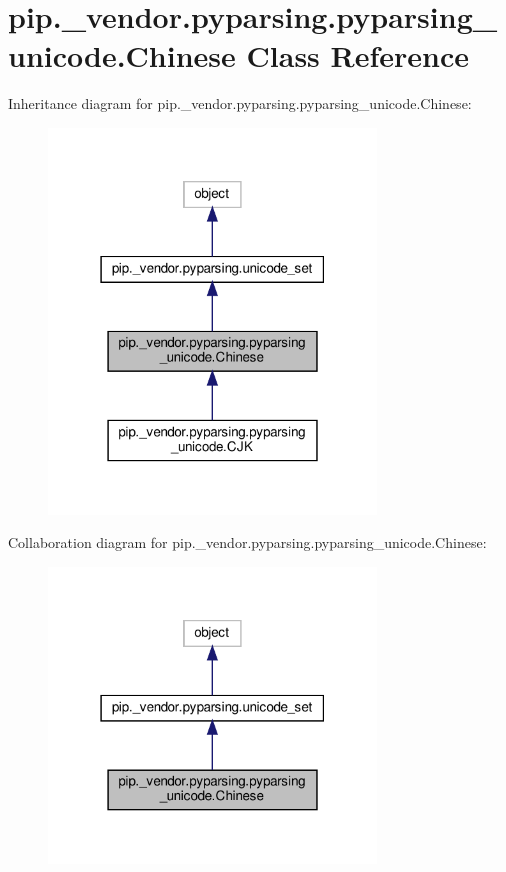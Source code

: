 \hypertarget{classpip_1_1__vendor_1_1pyparsing_1_1pyparsing__unicode_1_1Chinese}{}\section{pip.\+\_\+vendor.\+pyparsing.\+pyparsing\+\_\+unicode.\+Chinese Class Reference}
\label{classpip_1_1__vendor_1_1pyparsing_1_1pyparsing__unicode_1_1Chinese}


Inheritance diagram for pip.\+\_\+vendor.\+pyparsing.\+pyparsing\+\_\+unicode.\+Chinese\+:
\nopagebreak
\begin{figure}[H]
\begin{center}
\leavevmode
\includegraphics[width=247pt]{classpip_1_1__vendor_1_1pyparsing_1_1pyparsing__unicode_1_1Chinese__inherit__graph}
\end{center}
\end{figure}


Collaboration diagram for pip.\+\_\+vendor.\+pyparsing.\+pyparsing\+\_\+unicode.\+Chinese\+:
\nopagebreak
\begin{figure}[H]
\begin{center}
\leavevmode
\includegraphics[width=247pt]{classpip_1_1__vendor_1_1pyparsing_1_1pyparsing__unicode_1_1Chinese__coll__graph}
\end{center}
\end{figure}
